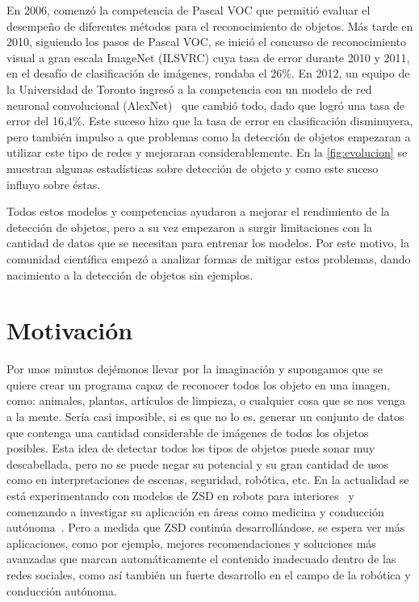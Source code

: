 En 2006, comenzó la competencia de Pascal VOC que permitió evaluar el desempeño de diferentes métodos para el reconocimiento de objetos. Más tarde en 2010, siguiendo los pasos de Pascal VOC, se inició el concurso de reconocimiento visual a gran escala ImageNet (ILSVRC) cuya tasa de error durante 2010 y 2011, en el desafío de clasificación de imágenes, rondaba el 26\%.  En 2012, un equipo de la Universidad de Toronto ingresó a la competencia con un modelo de red neuronal convolucional (AlexNet)~\cite{krizhevsky2012imagenet} que cambió todo, dado que logró una tasa de error del 16,4\%. Este suceso hizo que la tasa de error en clasificación disminuyera, pero también impulso a que problemas como la detección de objetos empezaran a utilizar este tipo de redes y mejoraran considerablemente. En la \autoref{fig:evolucion} se muestran algunas estadísticas sobre detección de objeto y como este suceso influyo sobre éstas.

Todos estos modelos y competencias ayudaron a mejorar el rendimiento de la detección de objetos, pero a su vez empezaron a surgir limitaciones con la cantidad de datos que se necesitan para entrenar los modelos. Por este motivo, la comunidad científica empezó a analizar formas de mitigar estos problemas, dando nacimiento a la detección de objetos sin ejemplos.


\section{Motivación} \label{sec:motivacion}

Por unos minutos dejémonos llevar por la imaginación y supongamos que se quiere crear un programa capaz de reconocer todos los objeto en una imagen, como: animales, plantas, artículos de limpieza, o cualquier cosa que se nos venga a la mente. Sería casi imposible, si es que no lo es, generar un conjunto de datos que contenga una cantidad considerable de imágenes de todos los objetos posibles. Esta idea de detectar todos los tipos de objetos puede sonar muy descabellada, pero no se puede negar su potencial y su gran cantidad de usos como en interpretaciones de escenas, seguridad, robótica, etc. En la actualidad se está experimentando con modelos de ZSD en robots para interiores~\cite{abdalwhab2019zero} y comenzando a investigar su aplicación en áreas como medicina y conducción autónoma~\cite{rezaei2020zero}. Pero a medida que ZSD continúa desarrollándose, se espera ver más aplicaciones, como por ejemplo, mejores recomendaciones y soluciones más avanzadas que marcan automáticamente el contenido inadecuado dentro de las redes sociales, como así también un fuerte desarrollo en el campo de la robótica y conducción autónoma.


